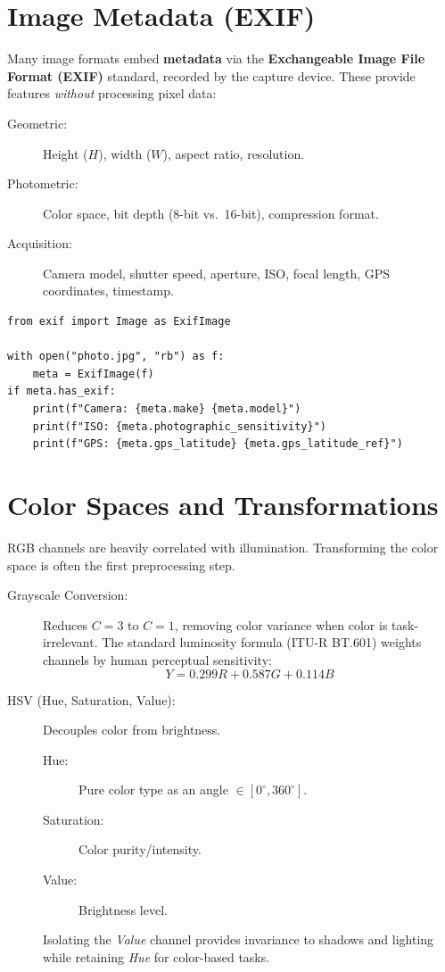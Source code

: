 \section*{Image Metadata (EXIF)}

Many image formats embed \textbf{metadata} via the \textbf{Exchangeable Image File Format (EXIF)} standard, recorded by the capture device. These provide features \textit{without} processing pixel data:

\begin{description}
    \item[Geometric:] Height ($H$), width ($W$), aspect ratio, resolution.
    \item[Photometric:] Color space, bit depth (8-bit vs.\ 16-bit), compression format.
    \item[Acquisition:] Camera model, shutter speed, aperture, ISO, focal length, GPS coordinates, timestamp.
\end{description}

\begin{lstlisting}[style=pythonstyle]
from exif import Image as ExifImage

with open("photo.jpg", "rb") as f:
    meta = ExifImage(f)
if meta.has_exif:
    print(f"Camera: {meta.make} {meta.model}")
    print(f"ISO: {meta.photographic_sensitivity}")
    print(f"GPS: {meta.gps_latitude} {meta.gps_latitude_ref}")
\end{lstlisting}

\section*{Color Spaces and Transformations}

RGB channels are heavily correlated with illumination. Transforming the color space is often the first preprocessing step.

\begin{description}
    \item[Grayscale Conversion:] Reduces $C=3$ to $C=1$, removing color variance when color is task-irrelevant. The standard luminosity formula (ITU-R BT.601) weights channels by human perceptual sensitivity:
    $$ Y = 0.299R + 0.587G + 0.114B $$
    \item[HSV (Hue, Saturation, Value):] Decouples color from brightness.
    \begin{description}
        \item[Hue:] Pure color type as an angle $\in [0^\circ, 360^\circ]$.
        \item[Saturation:] Color purity/intensity.
        \item[Value:] Brightness level.
    \end{description}
    Isolating the \textit{Value} channel provides invariance to shadows and lighting while retaining \textit{Hue} for color-based tasks.
\end{description}

